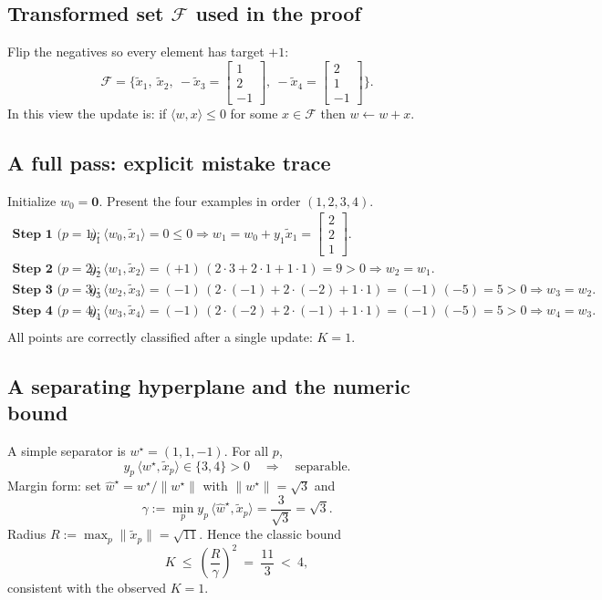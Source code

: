 \documentclass[11pt]{article}
\begin{document}
\subsection{Transformed set $\mathcal{F}$ used in the proof}
Flip the negatives so every element has target $+1$:
\[
\mathcal{F}=\Big\{\tilde x_1,\ \tilde x_2,\ -\tilde x_3=\begin{bmatrix}1\\2\\-1\end{bmatrix},\ -\tilde x_4=\begin{bmatrix}2\\1\\-1\end{bmatrix}\Big\}.
\]
In this view the update is: if $\langle w,x\rangle\le 0$ for some $x\in\mathcal{F}$ then $w\leftarrow w+x$.

\subsection{A full pass: explicit mistake trace}
Initialize $w_0=\mathbf{0}$. Present the four examples in order $(1,2,3,4)$.
\[
\begin{array}{ll}
\textbf{Step 1 (}p=1\textbf{):} & y_1\,\langle w_0,\tilde x_1\rangle=0\le 0\Rightarrow
w_1=w_0+y_1\tilde x_1=\begin{bmatrix}2\\2\\1\end{bmatrix}.\\[6pt]
\textbf{Step 2 (}p=2\textbf{):} & y_2\,\langle w_1,\tilde x_2\rangle
= (+1)\,(2\cdot 3+2\cdot 1+1\cdot 1)=9>0\Rightarrow w_2=w_1.\\[6pt]
\textbf{Step 3 (}p=3\textbf{):} & y_3\,\langle w_2,\tilde x_3\rangle
= (-1)\,(2\cdot(-1)+2\cdot(-2)+1\cdot 1)=(-1)\,(-5)=5>0\Rightarrow w_3=w_2.\\[6pt]
\textbf{Step 4 (}p=4\textbf{):} & y_4\,\langle w_3,\tilde x_4\rangle
= (-1)\,(2\cdot(-2)+2\cdot(-1)+1\cdot 1)=(-1)\,(-5)=5>0\Rightarrow w_4=w_3.\\[6pt]
\end{array}
\]
All points are correctly classified after a single update: $K=1$.

\subsection{A separating hyperplane and the numeric bound}
A simple separator is $w^\star=(1,1,-1)$. For all $p$,
\[
y_p\,\langle w^\star,\tilde x_p\rangle\in\{3,4\}>0
\quad\Rightarrow\quad\text{separable.}
\]
Margin form: set $\hat w^\star=w^\star/\|w^\star\|$ with $\|w^\star\|=\sqrt{3}$ and
\[
\gamma:=\min_p y_p\,\langle \hat w^\star,\tilde x_p\rangle=\frac{3}{\sqrt{3}}=\sqrt{3}.
\]
Radius $R:=\max_p\|\tilde x_p\|=\sqrt{11}$. Hence the classic bound
\[
K\ \le\ \left(\frac{R}{\gamma}\right)^2\ =\ \frac{11}{3}\ <\ 4,
\]
consistent with the observed $K=1$.
\end{document}
